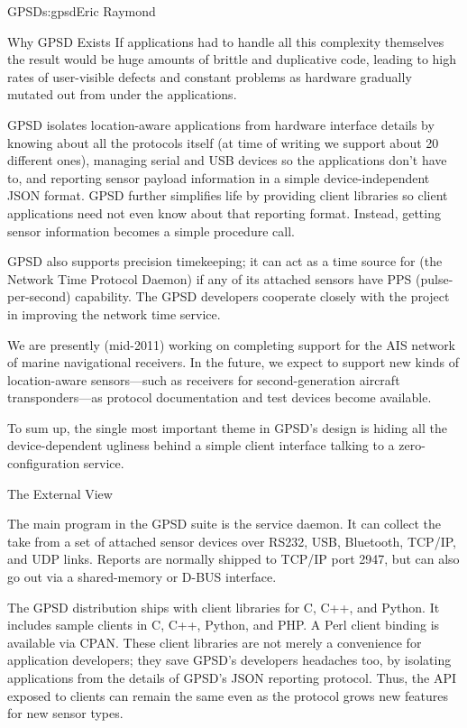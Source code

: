 \begin{aosachapter}{GPSD}{s:gpsd}{Eric Raymond}
\begin{aosasect1}{Why GPSD Exists}
If applications had to handle all this complexity themselves the
result would be huge amounts of brittle and duplicative code, leading
to high rates of user-visible defects and constant problems as
hardware gradually mutated out from under the applications.

GPSD isolates location-aware applications from hardware interface
details by knowing about all the protocols itself (at time of writing
we support about 20 different ones), managing serial and USB devices 
so the applications don't have to, and reporting sensor payload
information in a simple device-independent JSON format.  GPSD further
simplifies life by providing client libraries so client applications
need not even know about that reporting format.  Instead, getting
sensor information becomes a simple procedure call.

GPSD also supports precision timekeeping; it can act as a time source
for  (the Network Time Protocol Daemon) if any of its
attached sensors have PPS (pulse-per-second) capability. The GPSD
developers cooperate closely with the  project in improving
the network time service.

We are presently (mid-2011) working on completing support for the AIS
network of marine navigational receivers.  In the future, we expect to
support new kinds of location-aware sensors---such as receivers for
second-generation aircraft transponders---as protocol documentation
and test devices become available.

To sum up, the single most important theme in GPSD's design is
hiding all the device-dependent ugliness behind a simple client
interface talking to a zero-configuration service.

\end{aosasect1}

\begin{aosasect1}{The External View}

The main program in the GPSD suite is the  service daemon.
It can collect the take from a set of attached sensor devices over
RS232, USB, Bluetooth, TCP/IP, and UDP links. Reports are normally
shipped to TCP/IP port 2947, but can also go out via a shared-memory
or D-BUS interface.

The GPSD distribution ships with client libraries for C, C++, and
Python.  It includes sample clients in C, C++, Python, and PHP. A Perl
client binding is available via CPAN.  These client libraries are not
merely a convenience for application developers; they save GPSD's
developers headaches too, by isolating applications from the details
of GPSD's JSON reporting protocol.  Thus, the API exposed to clients
can remain the same even as the protocol grows new features for new
sensor types.


\end{aosasect1}
\end{aosachapter}
